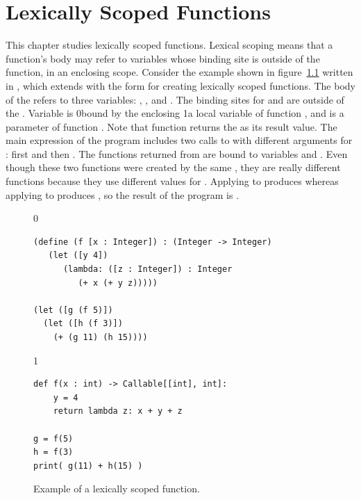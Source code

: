 \documentclass[7x10]{TimesAPriori_MIT}%
\def\racketEd{0}
\def\pythonEd{1}
\def\edition{1}
\newcommand{\racket}[1]{{\if\edition\racketEd{#1}\fi}}
\newcommand{\pythonColor}[0]{}
\newcommand{\python}[1]{{\if\edition\pythonEd\pythonColor #1\fi}}
\numberwithin{theorem}{chapter}
\numberwithin{definition}{chapter}
\numberwithin{equation}{chapter}
\begin{document}




\chapter{Lexically Scoped Functions}
\label{ch:Llambda}
\setcounter{footnote}{0}

This chapter studies lexically scoped functions. Lexical
scoping means that a function's body
may refer to variables whose binding site is outside of the function,
in an enclosing scope.
%
Consider the example shown in figure~\ref{fig:lexical-scoping} written
in \LangLam{}, which extends \LangFun{} with the
 form for creating lexically scoped
functions.  The body of the  refers to three variables:
, , and . The binding sites for  and
 are outside of the . Variable  is
\racket{bound by the enclosing }\python{a local variable of
  function }, and  is a parameter of function
. Note that function  returns the  as its
result value. The main expression of the program includes two calls to
 with different arguments for : first  and
then . The functions returned from  are bound to
variables  and . Even though these two functions were
created by the same , they are really different functions
because they use different values for . Applying  to
 produces  whereas applying  to 
produces , so the result of the program is .

\begin{figure}[btp]
\begin{tcolorbox}[colback=white]
{\if\edition\racketEd
\begin{lstlisting}
(define (f [x : Integer]) : (Integer -> Integer)
   (let ([y 4])
      (lambda: ([z : Integer]) : Integer
         (+ x (+ y z)))))

(let ([g (f 5)])
  (let ([h (f 3)])
    (+ (g 11) (h 15))))
\end{lstlisting}
\fi}
{\if\edition\pythonEd\pythonColor
\begin{lstlisting}
def f(x : int) -> Callable[[int], int]:
    y = 4
    return lambda z: x + y + z

g = f(5)
h = f(3)
print( g(11) + h(15) )
\end{lstlisting}
\fi}
\end{tcolorbox}
\caption{Example of a lexically scoped function.}
\label{fig:lexical-scoping}
\end{figure}
\end{document}
